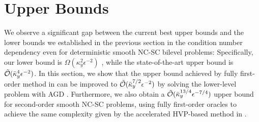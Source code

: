 \documentclass{article}
\begin{document}





\section{Upper Bounds} \label{sec:ub}


We observe a significant gap between 
the current best upper bounds and the lower bounds we established in the previous section in the condition number dependency even for deterministic smooth NC-SC bilevel problems: Specifically, our lower bound is $\Omega(\kappa_y^2 \epsilon^{-2})$ , while the state-of-the-art upper bound \citep{ji2021bilevel,chen2023near} is $\tilde {{\mathcal{O}}}(\bar \kappa_y^4 \epsilon^{-2})$. In this section,
we show that the upper bound achieved by fully first-order method in \citep{chen2023near} can be improved to $\tilde {{\mathcal{O}}}(\bar \kappa_y^{7/2} \epsilon^{-2})$ 
by solving the lower-level problem with AGD \citep{nesterov1983method}. 
Furthermore, we also obtain a $\tilde {{\mathcal{O}}}(\bar \kappa_y^{13/4} \epsilon^{-7/4})$ upper bound for second-order smooth NC-SC problems, using fully first-order oracles to achieve the same complexity given by the accelerated HVP-based method in \citep{yang2023accelerating}.
\end{document}
